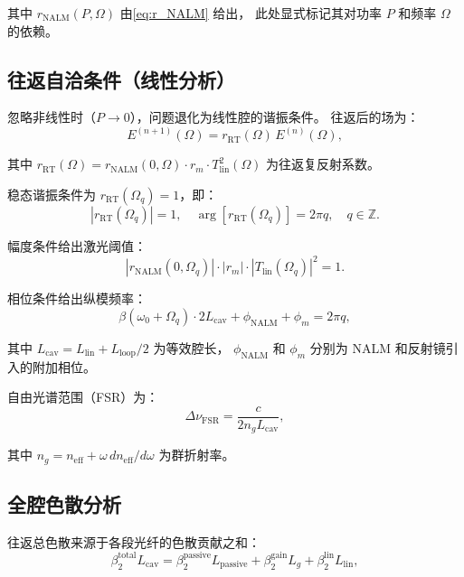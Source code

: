 \documentclass[11pt,a4paper]{ctexart}
\begin{document}
其中 $r_{\text{NALM}}(P, \Omega)$ 由\cref{eq:r_NALM} 给出，
此处显式标记其对功率 $P$ 和频率 $\Omega$ 的依赖。

\subsection{往返自洽条件（线性分析）}

忽略非线性时（$P \to 0$），问题退化为线性腔的谐振条件。
往返后的场为：
\begin{equation}
  E^{(n+1)}(\Omega) = r_{\text{RT}}(\Omega) \, E^{(n)}(\Omega),
  \label{eq:linear_RT}
\end{equation}

其中 $r_{\text{RT}}(\Omega) = r_{\text{NALM}}(0,\Omega) \cdot r_m \cdot
T_{\text{lin}}^2(\Omega)$ 为往返复反射系数。

稳态谐振条件为 $r_{\text{RT}}(\Omega_q) = 1$，即：
\begin{equation}
  |r_{\text{RT}}(\Omega_q)| = 1, \quad
  \arg[r_{\text{RT}}(\Omega_q)] = 2\pi q, \quad q \in \mathbb{Z}.
  \label{eq:resonance}
\end{equation}

幅度条件给出激光阈值：
\begin{equation}
  |r_{\text{NALM}}(0,\Omega_q)| \cdot |r_m| \cdot |T_{\text{lin}}(\Omega_q)|^2 = 1.
  \label{eq:threshold}
\end{equation}

相位条件给出纵模频率：
\begin{equation}
  \beta(\omega_0 + \Omega_q) \cdot 2L_{\text{cav}} + \phi_{\text{NALM}} + \phi_m = 2\pi q,
  \label{eq:phase_cond}
\end{equation}

其中 $L_{\text{cav}} = L_{\text{lin}} + L_{\text{loop}}/2$ 为等效腔长，
$\phi_{\text{NALM}}$ 和 $\phi_m$ 分别为 NALM 和反射镜引入的附加相位。

自由光谱范围（FSR）为：
\begin{equation}
  \Delta\nu_{\text{FSR}} = \frac{c}{2n_g L_{\text{cav}}},
  \label{eq:FSR}
\end{equation}

其中 $n_g = n_{\text{eff}} + \omega \, dn_{\text{eff}}/d\omega$ 为群折射率。

\subsection{全腔色散分析}

往返总色散来源于各段光纤的色散贡献之和：
\begin{equation}
  \beta_2^{\text{total}} L_{\text{cav}} = \beta_2^{\text{passive}} L_{\text{passive}}
  + \beta_2^{\text{gain}} L_g
  + \beta_2^{\text{lin}} L_{\text{lin}},
  \label{eq:total_dispersion}
\end{equation}
\end{document}
